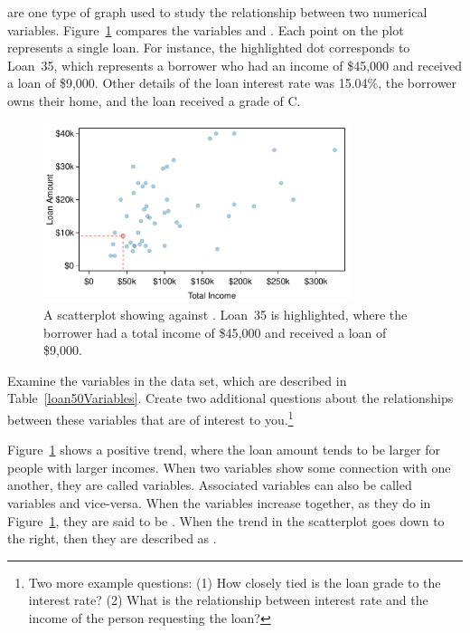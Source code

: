  are one type of graph
used to study the relationship between two numerical variables.
Figure~\ref{loan_amount_vs_income} compares the variables
and .
Each point on the plot represents a single loan.
For instance, the highlighted dot corresponds to
Loan~35, which represents a borrower who had an
income of \$45,000 and received a loan of \$9,000.
Other details of the loan interest rate was 15.04\%,
the borrower owns their home,
and the loan received a grade of C.

\begin{figure}
\centering
\includegraphics[width=0.8\textwidth]{ch_intro_to_data/figures/loan_amount_vs_income/loan_amount_vs_income}
\caption{A scatterplot showing 
  against . Loan~35 is highlighted,
  where the borrower had a total income of \$45,000 and received
  a loan of \$9,000.}
\label{loan_amount_vs_income}
\end{figure}

\begin{exercise}
Examine the variables in the  data set,
which are described in Table~\vref{loan50Variables}.
Create two additional questions about the relationships
between these variables that are of interest to
you.\footnote{Two more example questions:
  (1) How closely tied is the loan grade to the interest rate?
  (2) What is the relationship between interest rate and the
      income of the person requesting the loan?}
\end{exercise}

Figure~\ref{loan_amount_vs_income}
shows a positive trend, where the loan amount
tends to be larger for people with larger incomes.
When two variables show some connection with one another,
they are called  variables.
Associated variables can also be called 
variables and vice-versa.
When the variables increase together,
as they do in Figure~\ref{loan_amount_vs_income},
they are said to be .
When the trend in the scatterplot goes down to the right,
then they are described as .

